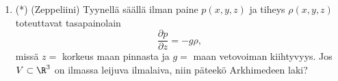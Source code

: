 \begin{enumerate}
\item (*) 
(Zeppeliini) Tyynellä säällä ilman paine $p(x,y,z)$ ja tiheys $\rho(x,y,z)$ toteuttavat
tasapainolain
\[
\frac{\partial p}{\partial z} = -g\rho,
\]
missä $z=$ korkeus maan pinnasta ja $g=$ maan vetovoiman kiihtyvyys. Jos $V\subset\R^3$ on
ilmassa leijuva ilmalaiva, niin päteekö Arkhimedeen laki?

\end{enumerate}